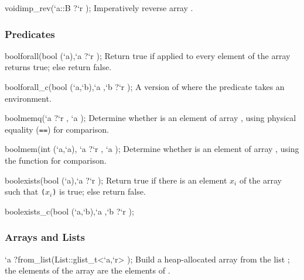 \begin{defun2}{void}{imp_rev}{(`a::B {?}`r );}
  Imperatively reverse array .
\end{defun2}

\subsubsection*{Predicates}

\begin{defun2}{bool}{forall}{(bool (`a),`a {?}`r );}
  Return true if  applied to every element of the array
   returns true; else return false.
\end{defun2}

\begin{defun2}{bool}{forall_c}{(bool (`a,`b),`a ,`b {?}`r );}
  A version of  where the predicate takes an environment.
\end{defun2}

\begin{defun2}{bool}{memq}{(`a {?}`r , `a );}
  Determine whether  is an element of array , using
  physical equality (\texttt{==}) for comparison.
\end{defun2}

\begin{defun2}{bool}{mem}{(int (`a,`a), `a {?}`r , `a );}
  Determine whether  is an element of array ,
  using the function  for comparison.
\end{defun2}

\begin{defun2}{bool}{exists}{(bool (`a),`a {?}`r );}
  Return true if there is an element $x_i$ of the array  such
  that \texttt{($x_i$)} is true; else return false.
\end{defun2}
\begin{defun2}{bool}{exists_c}{(bool (`a,`b),`a ,`b {?}`r );}
\end{defun2}

\subsubsection*{Arrays and Lists}

\begin{defun2}{`a ?}{from_list}{(List::glist_t<`a,`r> );}
  Build a heap-allocated array from the list ; the elements
  of the array are the elements of .
\end{defun2}

